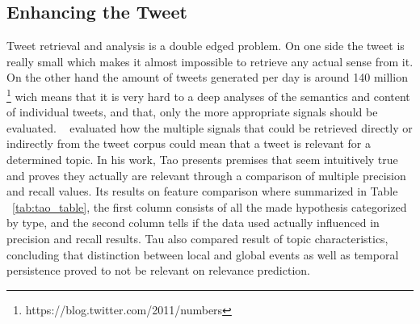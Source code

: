 \subsection{Enhancing the Tweet} 
\label{sub:the_tweet}
Tweet retrieval and analysis is a double edged problem. On one side the tweet is really small which makes it almost impossible to retrieve any actual sense from it. On the other hand the amount of tweets generated per day is around 140 million \footnote{https://blog.twitter.com/2011/numbers} wich means that it is very hard to a deep analyses of the semantics and content of individual tweets, and that, only the more appropriate signals should be evaluated.
~\citet{Tao2012} evaluated how the multiple signals that could be retrieved directly or indirectly from the tweet corpus could mean that a tweet is relevant for a determined topic. In his work, Tao presents premises that seem intuitively true and proves they actually are relevant through a comparison of multiple precision and recall values. Its results on feature comparison where summarized in Table ~\ref{tab:tao_table}, the first column consists of all the made hypothesis categorized by type, and the second column tells if the data used actually influenced in precision and recall results. Tau also compared result of topic characteristics, concluding that distinction between local and global events as well as temporal persistence proved to not be relevant on relevance prediction.

